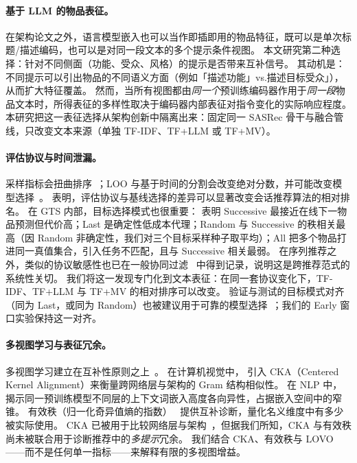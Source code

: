 \documentclass[sigconf,natbib=true,anonymous]{acmart}
\newcommand{\tfidf}{\textsc{TF-IDF}\xspace}
\newcommand{\tfllm}{\textsc{TF+LLM}\xspace}
\newcommand{\tfmv}{\textsc{TF+MV}\xspace}
\begin{document}
\paragraph{基于 LLM 的物品表征。}
在架构论文之外，语言模型嵌入也可以当作即插即用的物品特征，既可以是单次标题/描述编码，也可以是对同一段文本的多个提示条件视图。
本文研究第二种选择：针对不同侧面（功能、受众、风格）的提示是否带来互补信号。
其动机是：不同提示可以引出物品的不同语义方面（例如「描述功能」vs.\「描述目标受众」），从而扩大特征覆盖。
然而，当所有视图都由\emph{同一个}预训练编码器作用于\emph{同一段}物品文本时，所得表征的多样性取决于编码器内部表征对指令变化的实际响应程度。
本研究把这一表征选择从架构创新中隔离出来：固定同一 SASRec 骨干与融合管线，只改变文本来源（单独 \tfidf、\tfllm 或 \tfmv）。

\paragraph{评估协议与时间泄漏。}
采样指标会扭曲排序~\cite{krichene2020sampledmetrics}；LOO 与基于时间的分割会改变绝对分数，并可能改变模型选择~\cite{ji2023evaluation,sun2023reevaluation,meng2020temporal}。
\citet{ludewig2018evaluation} 表明，评估协议与基线选择的差异可以显著改变会话推荐算法的相对排名。
在 GTS 内部，目标选择模式也很重要：\citet{gusak2025time} 表明 Successive 最接近在线下一物品预测但代价高；Last 是确定性低成本代理；Random 与 Successive 的秩相关最高（因 Random 非确定性，我们对三个目标采样种子取平均）；All 把多个物品打进同一真值集合，引入任务不匹配，且与 Successive 相关最弱。
在序列推荐之外，类似的协议敏感性也已在一般协同过滤~\cite{meng2020temporal} 中得到记录，说明这是跨推荐范式的系统性关切。
我们将这一发现专门化到文本表征：在同一套协议变化下，\tfidf、\tfllm 与 \tfmv 的相对排序可以改变。
验证与测试的目标模式对齐（同为 Last，或同为 Random）也被建议用于可靠的模型选择~\cite{gusak2025time}；我们的 Early 窗口实验保持这一对齐。

\paragraph{多视图学习与表征冗余。}
多视图学习建立在互补性原则之上~\cite{xu2013multiview}。
在计算机视觉中，\citet{kornblith2019cka} 引入 CKA（Centered Kernel Alignment）来衡量跨网络层与架构的 Gram 结构相似性。
在 NLP 中，\citet{ethayarajh2019contextual} 揭示同一预训练模型不同层的上下文词嵌入高度各向异性，占据嵌入空间中的窄锥。
有效秩（归一化奇异值熵的指数）~\cite{roy2007effective} 提供互补诊断，量化名义维度中有多少被实际使用。
CKA 已被用于比较网络层与架构~\cite{kornblith2019cka}，但据我们所知，CKA 与有效秩尚未被联合用于诊断推荐中的\emph{多提示}冗余。
我们结合 CKA、有效秩与 LOVO——而不是任何单一指标——来解释有限的多视图增益。
\end{document}
